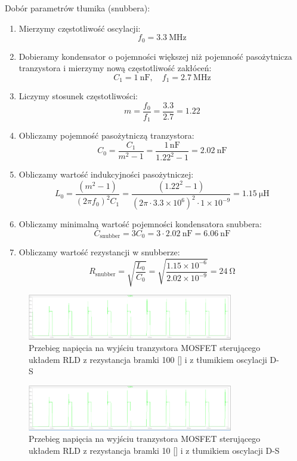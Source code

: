 \documentclass[11pt]{article}
\begin{document}
Dobór parametrów tłumika (snubbera):
\begin{enumerate}
  \item Mierzymy częstotliwość oscylacji:
  \[
  f_0 = \SI{3.3}{\mega\hertz}
  \]
  \item Dobieramy kondensator o pojemności większej niż pojemność pasożytnicza tranzystora i mierzymy nową częstotliwość zakłóceń:
  \[
  C_1 = \SI{1}{\nano\farad}, \quad f_1 = \SI{2.7}{\mega\hertz}
  \]
  \item Liczymy stosunek częstotliwości:
  \[
  m = \frac{f_0}{f_1} = \frac{3.3}{2.7} = 1.22
  \]
  \item Obliczamy pojemność pasożytniczą tranzystora:
  \[
  C_0 = \frac{C_1}{m^2 - 1} = \frac{1\,\text{nF}}{1.22^2 - 1} = \SI{2.02}{\nano\farad}
  \]
  \item Obliczamy wartość indukcyjności pasożytniczej:
  \[
  L_0 = \frac{(m^2 - 1)}{(2\pi f_0)^2 C_1} = \frac{(1.22^2 - 1)}{(2\pi \cdot 3.3 \times 10^6)^2 \cdot 1 \times 10^{-9}} = \SI{1.15}{\micro\henry}
  \]
  \item Obliczamy minimalną wartość pojemności kondensatora snubbera:
  \[
  C_{\text{snubber}} = 3C_0 = 3 \cdot \SI{2.02}{\nano\farad} = \SI{6.06}{\nano\farad}
  \]
  \item Obliczamy wartość rezystancji w snubberze:
  \[
  R_{\text{snubber}} = \sqrt{\frac{L_0}{C_0}} = \sqrt{\frac{1.15 \times 10^{-6}}{2.02 \times 10^{-9}}} = \SI{24}{\ohm}
  \]
\end{enumerate}

\begin{figure}[H]
\centering
\includegraphics[width=0.8\textwidth]{aun1_rld_with_snubber_rgate100ohm.png}
\caption{Przebieg napięcia na wyjściu tranzystora MOSFET sterującego układem RLD z rezystancja bramki 100 [\Omega] i z tłumikiem oscylacji D-S}
\end{figure}

\begin{figure}[H]
\centering
\includegraphics[width=0.8\textwidth]{aun1_rld_with_snubber_rgate10ohm.png}
\caption{Przebieg napięcia na wyjściu tranzystora MOSFET sterującego układem RLD z rezystancja bramki 10 [\Omega] i z tłumikiem oscylacji D-S}
\end{figure}
\end{document}
